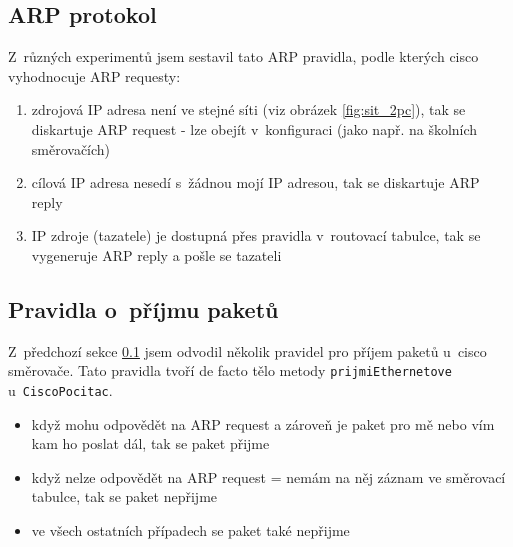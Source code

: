

\subsection{ARP protokol} \label{arp}
\textit{} \cite{wiki:arp}

Z~různých experimentů jsem sestavil tato ARP pravidla, podle kterých cisco vyhodnocuje ARP requesty:
\begin{enumerate}
 \item zdrojová IP adresa není ve stejné síti (viz obrázek \ref{fig:sit_2pc}), tak se diskartuje ARP request - lze obejít v~konfiguraci (jako např. na školních směrovačích)
 \item cílová IP adresa nesedí s~žádnou mojí IP adresou, tak se diskartuje ARP reply
 \item IP zdroje (tazatele) je dostupná přes pravidla v~routovací tabulce, tak se vygeneruje ARP reply a pošle se tazateli
\end{enumerate}


\subsection{Pravidla o~příjmu paketů} 
Z~předchozí sekce \ref{arp} jsem odvodil několik pravidel pro příjem paketů u~cisco směrovače. Tato pravidla tvoří de facto tělo metody \verb|prijmiEthernetove| u~\verb|CiscoPocitac|.

\begin{itemize}
 \item když mohu odpovědět na ARP request a zároveň je paket pro mě nebo vím kam ho poslat dál, tak se paket přijme
 \item když nelze odpovědět na ARP request = nemám na něj záznam ve směrovací tabulce, tak se paket nepřijme
 \item ve všech ostatních případech se paket také nepřijme
\end{itemize}




